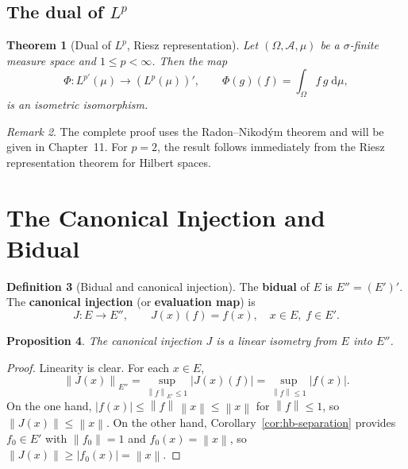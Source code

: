 \documentclass[a4paper,12pt]{book}
\newcommand{\dd}{\mathrm{d}}
\newcommand{\norm}[1]{\left\| #1 \right\|}
\theoremstyle{definition}
\newtheorem{definition}{Definition}[chapter]
\theoremstyle{plain}
\newtheorem{theorem}[definition]{Theorem}
\newtheorem{proposition}[definition]{Proposition}
\theoremstyle{remark}
\newtheorem{remark}[definition]{Remark}
\begin{document}
\subsection{The dual of \texorpdfstring{$L^p$}{Lp}}

\begin{theorem}[{Dual of $L^p$, Riesz representation}]\label{thm:dual-Lp}
Let $(\Omega,\mathcal{A},\mu)$ be a $\sigma$-finite measure space and
$1\le p<\infty$.  Then the map
\[
  \Phi: L^{p'}(\mu) \longrightarrow (L^p(\mu))',
  \qquad \Phi(g)(f) = \int_\Omega f\,g\;\dd\mu,
\]
is an isometric isomorphism.
\end{theorem}

\begin{remark}
The complete proof uses the Radon--Nikod\'ym theorem
and will be given in Chapter~11.  For $p=2$, the result follows immediately
from the Riesz representation theorem for Hilbert spaces.
\end{remark}

\section{The Canonical Injection and Bidual}\label{sec:bidual}

\begin{definition}[Bidual and canonical injection]\label{def:bidual}
The \textbf{bidual} of $E$ is $E'' = (E')'$.  The \textbf{canonical injection}
(or \textbf{evaluation map}) is
\[
  J: E \longrightarrow E'',
  \qquad J(x)(f) = f(x),\quad x\in E,\; f\in E'.
\]
\end{definition}

\begin{proposition}\label{prop:J-isometry}
The canonical injection $J$ is a linear isometry from $E$ into $E''$.
\end{proposition}

\begin{proof}
Linearity is clear.  For each $x\in E$,
\[
  \norm{J(x)}_{E''} = \sup_{\norm{f}_{E'}\le 1} |J(x)(f)|
  = \sup_{\norm{f}\le 1} |f(x)|.
\]
On the one hand, $|f(x)|\le\norm{f}\,\norm{x}\le\norm{x}$ for $\norm{f}\le 1$,
so $\norm{J(x)}\le\norm{x}$.  On the other hand,
Corollary~\ref{cor:hb-separation} provides $f_0\in E'$ with $\norm{f_0}=1$ and
$f_0(x)=\norm{x}$, so $\norm{J(x)}\ge |f_0(x)| = \norm{x}$.
\end{proof}
\end{document}
